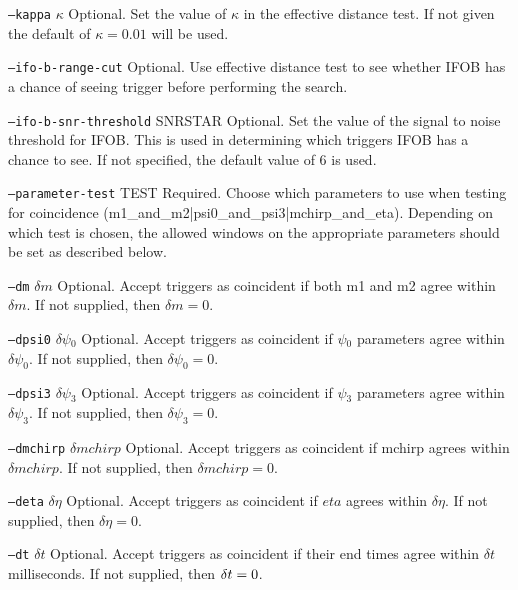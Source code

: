 \begin{entry}
\begin{entry}
\item[\texttt{--kappa} \textsc{$\kappa$}] Optional. Set the value of
$\kappa$ in the effective distance test. If not given the default of
$\kappa= 0.01$ will be used.

\item[\texttt{--ifo-b-range-cut}] Optional.  Use effective distance test
to see whether \textsc{IFOB} has a chance of seeing trigger before
performing the search.

\item[\texttt{--ifo-b-snr-threshold} \textsc{SNRSTAR}] Optional.  Set the 
value of the signal to noise threshold for \textsc{IFOB}.  This is used in
determining which triggers \textsc{IFOB} has a chance to see.  If not
specified, the default value of 6 is used.

\item[\texttt{--parameter-test} TEST] Required. Choose which parameters
to use when testing for coincidence
(m1\_and\_m2|psi0\_and\_psi3|mchirp\_and\_eta).  Depending on which test
is chosen, the allowed windows on the appropriate parameters should be
set as described below.

\item[\texttt{--dm} \textsc{$\delta m$}] Optional. Accept triggers as
coincident if both m1 and m2 agree within $\delta m$.  If not supplied,
	   then $\delta m = 0$.

\item[\texttt{--dpsi0} \textsc{$\delta \psi_0$}] Optional. Accept
triggers as coincident if \textsc{$\psi_0$} parameters agree within
$\delta \psi_0$.  If not supplied,  then $\delta  \psi_0 = 0$.

\item[\texttt{--dpsi3} \textsc{$\delta \psi_3$}] Optional. Accept
triggers as coincident if \textsc{$\psi_3$} parameters agree within
$\delta \psi_3$.  If not supplied,  then $\delta  \psi_3 = 0$.

\item[\texttt{--dmchirp} \textsc{$\delta mchirp$}] Optional. Accept
triggers as coincident if mchirp agrees within $\delta mchirp$.  If not
supplied,  then $\delta mchirp = 0$.

\item[\texttt{--deta} \textsc{$\delta \eta$}] Optional. Accept triggers
as coincident if $eta$ agrees within $\delta \eta$.  If not supplied,
then $\delta \eta = 0$.

\item[\texttt{--dt} \textsc{$\delta t$}] Optional. Accept triggers as
coincident if their end times agree within $\delta t$ milliseconds.  If
not supplied,  then $\textsc{$\delta t$} = 0$.


\end{entry}
\end{entry}
